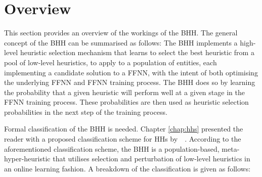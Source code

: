 \section{Overview}\label{sec:bhh:overview}

This section provides an overview of the workings of the \Acf{BHH}. The general concept of the \acs{BHH} can be summarised as follows: The \acs{BHH} implements a high-level heuristic selection mechanism that learns to select the best heuristic from a pool of low-level heuristics, to apply to a population of entities, each implementing a candidate solution to a \acs{FFNN}, with the intent of both optimising the underlying \acs{FFNN} and \acs{FFNN} training process. The \acs{BHH} does so by learning the probability that a given heuristic will perform well at a given stage in the \acs{FFNN} training process. These probabilities are then used as heuristic selection probabilities in the next step of the training process.

Formal classification of the \Acs{BHH} is needed. Chapter \ref{chap:hhs} presented the reader with a proposed classification scheme for \acp{HH} by~\citeauthor{ref:burke:2010}~\cite{ref:burke:2010}. According to the aforementioned classification scheme, the \Acs{BHH} is a population-based, meta-hyper-heuristic that utilises selection and perturbation of low-level heuristics in an online learning fashion. A breakdown of the classification is given as follows:

